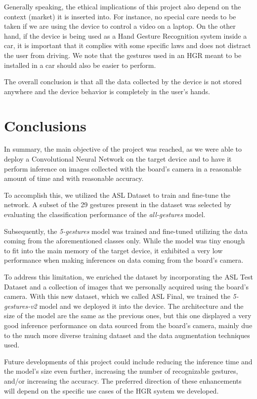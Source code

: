 \documentclass{Configuration_Files/PoliMi3i_thesis}
\begin{document}
Generally speaking, the ethical implications of this project also depend on the context (market) it is inserted into. For instance, no special care needs to be taken if we are using the device to control a video on a laptop. On the other hand, if the device is being used as a Hand Gesture Recognition system inside a car, it is important that it complies with some specific laws and does not distract the user from driving. We note that the gestures used in an HGR meant to be installed in a car should also be easier to perform.

The overall conclusion is that all the data collected by the device is not stored anywhere and the device behavior is completely in the user's hands.

\chapter{Conclusions}
\label{ch:conclusions}%
In summary, the main objective of the project was reached, as we were able to deploy a Convolutional Neural Network on the target device and to have it perform inference on images collected with the board's camera in a reasonable amount of time and with reasonable accuracy. 

To accomplish this, we utilized the ASL Dataset to train and fine-tune the network. A subset of the 29 gestures present in the dataset was selected by evaluating the classification performance of the \textit{all-gestures} model. 

Subsequently, the \textit{5-gestures} model was trained and fine-tuned utilizing the data coming from the aforementioned classes only. While the model was tiny enough to fit into the main memory of the target device, it exhibited a very low performance when making inferences on data coming from the board's camera.

To address this limitation, we enriched the dataset by incorporating the ASL Test Dataset and a collection of images that we personally acquired using the board's camera. With this new dataset, which we called ASL Final, we trained the \textit{5-gestures-v2} model and we deployed it into the device. The architecture and the size of the model are the same as the previous ones, but this one displayed a very good inference performance on data sourced from the board's camera, mainly due to the much more diverse training dataset and the data augmentation techniques used. 

Future developments of this project could include reducing the inference time and the model's size even further, increasing the number of recognizable gestures, and/or increasing the accuracy. The preferred direction of these enhancements will depend on the specific use cases of the HGR system we developed.




\cleardoublepage
\end{document}
